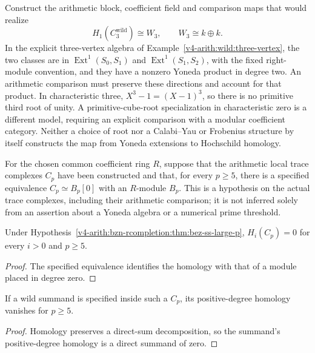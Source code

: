 \begin{question}
\label{v4-arith:bzn-rcompletion:prop:R4-Ext1-p3}
Construct the arithmetic block, coefficient field and comparison
maps that would realize
\begin{equation}
\label{v4-arith:bzn-rcompletion:eq:Ext1-p3}
 H_1(C_3^{\mathrm{wild}})\cong W_3,\qquad W_3\cong k\oplus k.
\end{equation}
In the explicit three-vertex algebra of
Example~\ref{v4-arith:wild:three-vertex}, the two classes are in
\(\operatorname{Ext}^1(S_0,S_1)\) and
\(\operatorname{Ext}^1(S_1,S_2)\), with the fixed right-module
convention, and they have a nonzero Yoneda product in degree two.
An arithmetic comparison must preserve these directions and account
for that product. In characteristic three,
\(X^3-1=(X-1)^3\), so there is no primitive third root of unity.
A primitive-cube-root specialization in characteristic zero is a
different model, requiring an explicit comparison with a modular
coefficient category. Neither a choice of root nor a
Calabi--Yau or Frobenius structure by itself constructs the map
from Yoneda extensions to Hochschild homology.
\end{question}

\begin{hypothesis}
\label{v4-arith:bzn-rcompletion:thm:bez-ss-large-p}
For the chosen common coefficient ring \(R\), suppose that the
arithmetic local trace complexes \(C_p\) have been constructed and
that, for every \(p\ge5\), there is a specified equivalence
\(C_p\simeq B_p[0]\) with an \(R\)-module \(B_p\).
This is a hypothesis on the actual trace complexes, including their
arithmetic comparison; it is not inferred solely from an assertion
about a Yoneda algebra or a numerical prime threshold.
\end{hypothesis}

\begin{corollary}
\label{v4-arith:bzn-rcompletion:cor:vanishing-at-large-p}
Under Hypothesis~\ref{v4-arith:bzn-rcompletion:thm:bez-ss-large-p},
\(H_i(C_p)=0\) for every \(i>0\) and \(p\ge5\).
\end{corollary}
\begin{proof}
The specified equivalence identifies the homology with that of a
module placed in degree zero.
\end{proof}

\begin{corollary}
\label{v4-arith:bzn-rcompletion:thm:R4-correction-vanishes-p-large}
If a wild summand is specified inside such a \(C_p\), its
positive-degree homology vanishes for \(p\ge5\).
\end{corollary}
\begin{proof}
Homology preserves a direct-sum decomposition, so the summand's
positive-degree homology is a direct summand of zero.
\end{proof}

